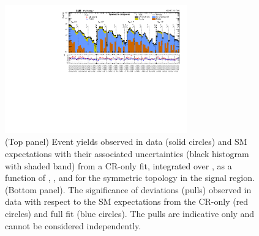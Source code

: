 \begin{figure}[!h]
  \begin{center}
    \includegraphics[angle=90,width=0.7\textwidth]{summaryPlot_Symmetric_prefit_overlay_fit_b}
    \caption{(Top panel) Event yields observed in data (solid circles)
      and SM expectations with their associated uncertainties (black
      histogram with shaded band) from a CR-only fit, integrated over
      \HTmiss, as a function of \njet, \nb, and \scalht for the
      symmetric topology in the signal region. (Bottom panel). The
      significance of deviations (pulls) observed in data with respect
      to the SM expectations from the CR-only (red circles) and full
      fit (blue circles). The pulls are indicative only and cannot be
      considered independently.}
    \label{fig:sym}
  \end{center}
\end{figure}

